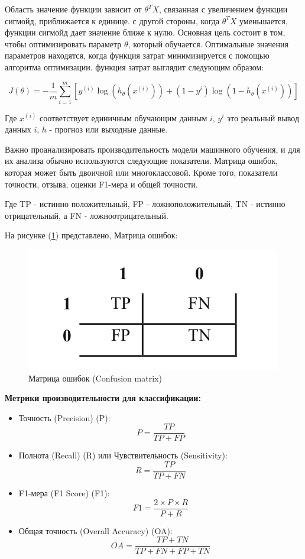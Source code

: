 Область значение функции зависит от \(\theta^{T} X\), связанная с увеличением функции сигмойд, приближается к единице. с другой стороны, когда \(\theta^{T} X\) уменьшается, функции сигмойд дает значение ближе к нулю. Основная цель состоит в том, чтобы оптимизировать параметр \(\theta\), который обучается. Оптимальные значения параметров находятся, когда функция затрат минимизируется с помощью алгоритма оптимизации. функция затрат выглядит следующим образом:

\begin{equation}
    J(\theta) = - \frac{1}{m} \sum_{i = 1}^{m} [y^{(i)} \log (h_{\theta} (x^{(i)})) + (1 - y^{i}) \log (1 - h_{\theta}(x^{(i)}))]
\end{equation}

Где \(x^{(i)}\) соответствует единичным обучающим данным \(i\), \(y^{i}\) это реальный вывод данных \(i\), \(h\) - прогноз или выходные данные.

Важно проанализировать производительность модели машинного обучения, и для их анализа обычно используются следующие показатели. Матрица ошибок, которая может быть двоичной или многоклассовой. Кроме того, показатели точности, отзыва, оценки F1-мера и общей точности.

Где TP - истинно положительный, FP - ложноположительный, TN - истинно отрицательный, а FN - ложноотрицательный.


На рисунке (\ref{fig:confusion-matrix}) представлено, Матрица ошибок: 
\begin{figure}[H]
	\centering
	\includegraphics[width=0.8\linewidth]{images/confusion_matrix.png}
	\caption{Матрица ошибок (Confusion matrix)}
	\label{fig:confusion-matrix}
\end{figure}

\textbf{Метрики производительности для классификации:}

\begin{itemize}
    \item Точность (Precision) (P):
    \[
    P = \frac{TP}{TP + FP}
    \]
    
    \item Полнота (Recall) (R) или Чувствительность (Sensitivity):
    \[
    R = \frac{TP}{TP + FN}
    \]
    
    \item F1-мера (F1 Score) (F1):
    \[
    F1 = \frac{2 \times P \times R}{P + R}
    \]
    
    \item Общая точность (Overall Accuracy) (OA):
    \[
    OA = \frac{TP + TN}{TP + FN + FP + TN}
    \]
    
\end{itemize}


